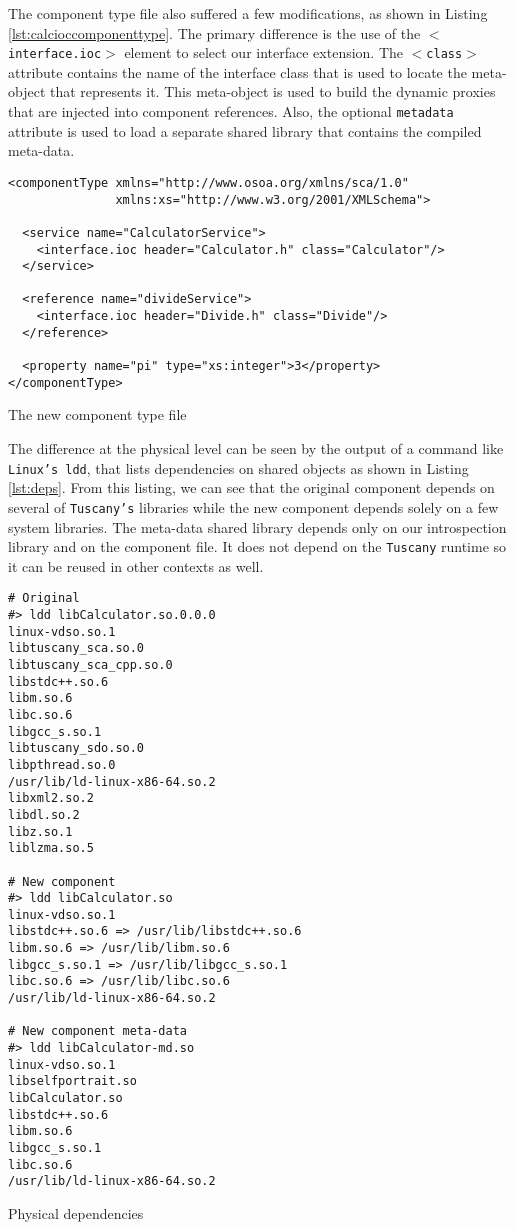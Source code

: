 The component type file also suffered a few modifications, as shown in Listing \ref{lst:calcioccomponenttype}.
The primary difference is the use of the \texttt{$<$interface.ioc$>$} element to select our interface extension.
The \texttt{$<$class$>$} attribute contains the name of the interface class that is used to locate the
meta-object that represents it. This meta-object is used to build the dynamic proxies that are injected into
component references. Also, the optional \texttt{metadata} attribute is used to load a separate shared library
that contains the compiled meta-data.

\begin{listing}[!htbp]
\begin{verbatim}
<componentType xmlns="http://www.osoa.org/xmlns/sca/1.0"
               xmlns:xs="http://www.w3.org/2001/XMLSchema">

  <service name="CalculatorService">
    <interface.ioc header="Calculator.h" class="Calculator"/>
  </service>

  <reference name="divideService">
    <interface.ioc header="Divide.h" class="Divide"/>
  </reference>
  
  <property name="pi" type="xs:integer">3</property>
</componentType>
\end{verbatim}
\caption{The new component type file}
\label{lst:calcioccomponenttype}
\end{listing}

The difference at the physical level can be seen by the output of a command like \texttt{Linux's ldd}, that lists
dependencies on shared objects as shown in Listing \ref{lst:deps}. From this listing, we can see that the original
component depends on several of \texttt{Tuscany's} libraries while the new component depends solely on a few system
libraries. The meta-data shared library depends only on our introspection library and on the component file. It does
not depend on the \texttt{Tuscany} runtime so it can be reused in other contexts as well.


\begin{listing}[!htbp]
\begin{verbatim}
# Original
#> ldd libCalculator.so.0.0.0 
linux-vdso.so.1
libtuscany_sca.so.0
libtuscany_sca_cpp.so.0
libstdc++.so.6
libm.so.6
libc.so.6
libgcc_s.so.1
libtuscany_sdo.so.0
libpthread.so.0
/usr/lib/ld-linux-x86-64.so.2
libxml2.so.2
libdl.so.2
libz.so.1
liblzma.so.5

# New component
#> ldd libCalculator.so 
linux-vdso.so.1
libstdc++.so.6 => /usr/lib/libstdc++.so.6
libm.so.6 => /usr/lib/libm.so.6
libgcc_s.so.1 => /usr/lib/libgcc_s.so.1
libc.so.6 => /usr/lib/libc.so.6
/usr/lib/ld-linux-x86-64.so.2

# New component meta-data
#> ldd libCalculator-md.so 
linux-vdso.so.1
libselfportrait.so
libCalculator.so
libstdc++.so.6
libm.so.6
libgcc_s.so.1
libc.so.6
/usr/lib/ld-linux-x86-64.so.2
 \end{verbatim}
\caption{Physical dependencies}
\label{lst:deps}
\end{listing}

